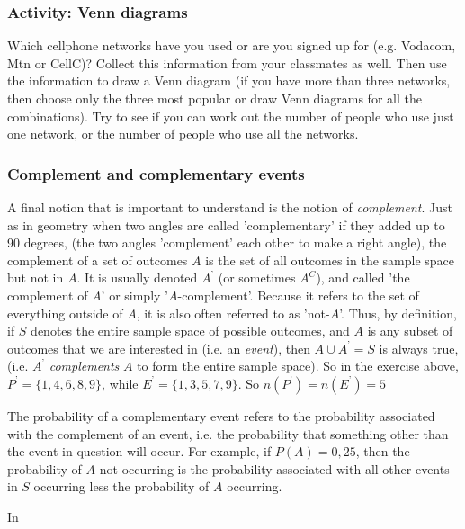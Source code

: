             \subsubsection{ Activity: Venn diagrams}
            \nopagebreak
            \label{m39377*eip-65}Which cellphone networks have you used or are you signed up for (e.g. Vodacom, Mtn or CellC)? Collect this information from your classmates as well. Then use the information to draw a Venn diagram (if you have more than three networks, then choose only the three most popular or draw Venn diagrams for all the combinations). Try to see if you can work out the number of people who use just one network, or the number of people who use all the networks.
\par \label{m39377*secfhsst!!!underscore!!!id3294}
            \subsubsection{ Complement and complementary events}
            \nopagebreak
\label{m39377*eip-442}A final notion that is important to understand is the notion
of \textsl{complement}.
Just as in geometry when two angles are called 'complementary' if they added up
to 90 degrees, (the two angles 'complement' each other to make a right angle), the complement of a set of outcomes $A$ is the set of all outcomes in the sample space but not in $A$. It is usually denoted
${A}^{\text{'}}$ (or sometimes ${A}^{C}$), and called 'the complement of $A$' or simply '$A$-complement'. Because it refers to the set of everything outside of $A$, it is also often referred to as 'not-$A$'. Thus, by definition, if $S$ denotes the entire sample space of possible outcomes, and $A$ is any subset of outcomes that we are interested in (i.e. an \textsl{event}), then $A\cup {A}^{\text{'}}=S$ is always
true, (i.e. ${A}^{\text{'}}$ \textsl{complements} $A$ to form the entire
sample space). So in the exercise above, ${P}^{\text{'}}=\{1,4,6,8,9\}$,
while ${E}^{\text{'}}=\{1,3,5,7,9\}$. So $n\left({P}^{\text{'}}\right)=n\left({E}^{\text{'}}\right)=5$\par \label{m39377*eip-324}The probability of a complementary event refers to the
probability associated with the complement of an event, i.e. the probability that something other than the event in question will occur. For example, if $P\left(A\right)=0,25$,
then the probability of $A$ not
occurring is the probability associated with all other events in $S$ occurring less the probability of
$A$ occurring.\par \label{m39377*eip-788}In
